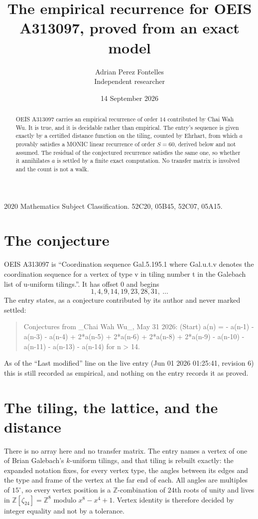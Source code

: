 \documentclass[11pt,a4paper]{article}
\title{The empirical recurrence for OEIS A313097, proved from an exact model}
\author{Adrian Perez Fontelles\\ \small Independent researcher}
\date{14 September 2026}
\theoremstyle{plain}
\theoremstyle{definition}
\begin{document}
\maketitle

\begin{abstract}
OEIS A313097 carries an empirical recurrence of order $14$ contributed by Chai Wah Wu. It is true, and it is
decidable rather than empirical. The entry's sequence is given exactly by a certified distance function on the tiling, counted by Ehrhart, from
which $a$ provably satisfies a MONIC linear recurrence of order $S=60$, derived below and not
assumed. The residual of the conjectured recurrence satisfies the same one, so whether it
annihilates $a$ is settled by a finite exact computation. No transfer matrix is involved and the count is not a walk.
\end{abstract}

\noindent\small 2020 Mathematics Subject Classification. 52C20, 05B45, 52C07, 05A15.\normalsize

\section{The conjecture}

OEIS A313097 is ``Coordination sequence Gal.5.195.1 where Gal.u.t.v denotes the coordination sequence for a vertex of type v in tiling number t in the Galebach list of u-uniform tilings.''. It has offset $0$ and begins
\[
1, 4, 9, 14, 19, 23, 28, 31,\ \dots
\]
The entry states, as a conjecture contributed by its author and never marked settled:
\begin{quote}
Conjectures from \_Chai Wah Wu\_, May 31 2026: (Start) a(n) = - a(n-1) - a(n-3) - a(n-4) + 2*a(n-5) + 2*a(n-6) + 2*a(n-8) + 2*a(n-9) - a(n-10) - a(n-11) - a(n-13) - a(n-14) for n > 14.
\end{quote}
As of the ``Last modified'' line on the live entry (Jun 01 2026 01:25:41, revision 6)
this is still recorded as empirical, and nothing on the entry records it as proved.

\section{The tiling, the lattice, and the distance}

There is no array here and no transfer matrix. The entry names a vertex of one of Brian
Galebach's $k$-uniform tilings, and that tiling is rebuilt exactly: the expanded notation
fixes, for every vertex type, the angles between its edges and the type and frame of the
vertex at the far end of each. All angles are multiples of $15^\circ$, so every vertex
position is a $\mathbb{Z}$-combination of $24$th roots of unity and lives in
$\mathbb{Z}[\zeta_{24}]=\mathbb{Z}^{8}$ modulo $x^{8}-x^{4}+1$. Vertex identity is
therefore decided by integer equality and not by a tolerance.
\end{document}
